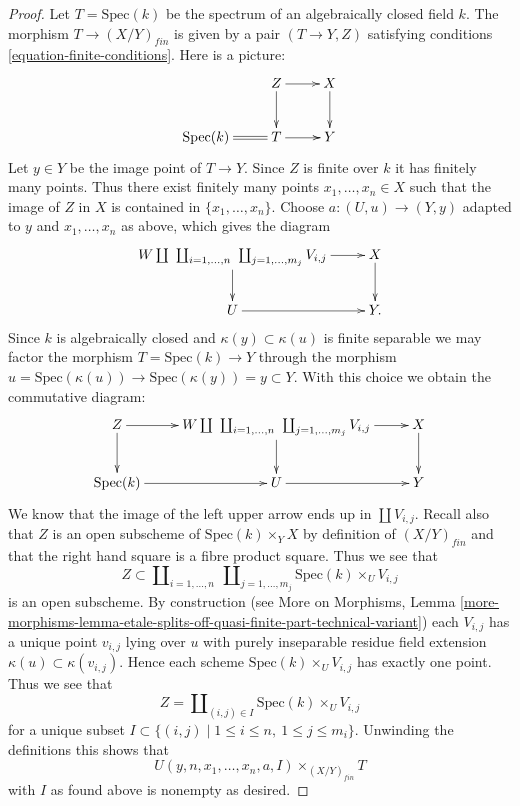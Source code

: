 \begin{proof}
\medskip\noindent
Let $T = \text{Spec}(k)$ be the spectrum of an algebraically closed
field $k$. The morphism $T \to (X/Y)_{fin}$ is given by a pair
$(T \to Y, Z)$ satisfying conditions \ref{equation-finite-conditions}.
Here is a picture:
$$
\xymatrix{
& Z \ar[d] \ar[r] & X \ar[d] \\
\text{Spec}(k) \ar@{=}[r] & T \ar[r] & Y
}
$$
Let $y \in Y$ be the image point of $T \to Y$.
Since $Z$ is finite over $k$ it has finitely many points.
Thus there exist finitely many points $x_1, \ldots, x_n \in X$
such that the image of $Z$ in $X$ is contained in $\{x_1, \ldots, x_n\}$.
Choose $a : (U, u) \to (Y, y)$ adapted to $y$ and $x_1, \ldots, x_n$ as
above, which gives the diagram
$$
\xymatrix{
W \coprod
\ \coprod\nolimits_{i = 1, \ldots, n}
\ \coprod\nolimits_{j = 1, \ldots, m_j}
V_{i, j} \ar[d] \ar[r] &
X \ar[d] \\
U \ar[r] & Y.
}
$$
Since $k$ is algebraically closed and
$\kappa(y) \subset \kappa(u)$ is finite separable
we may factor the morphism
$T = \text{Spec}(k) \to Y$ through the morphism
$u = \text{Spec}(\kappa(u)) \to \text{Spec}(\kappa(y)) = y \subset Y$.
With this choice we obtain the commutative diagram:
$$
\xymatrix{
Z \ar[d] \ar[r] &
W \coprod
\ \coprod\nolimits_{i = 1, \ldots, n}
\ \coprod\nolimits_{j = 1, \ldots, m_j}
V_{i, j} \ar[d] \ar[r] &
X \ar[d] \\
\text{Spec}(k) \ar[r] &
U \ar[r] & Y
}
$$
We know that the image of the left upper arrow ends up in
$\coprod V_{i, j}$. Recall also that $Z$ is an open subscheme
of $\text{Spec}(k) \times_Y X$ by definition of $(X/Y)_{fin}$
and that the right hand square is a fibre product square.
Thus we see that
$$
Z \subset
\coprod\nolimits_{i = 1, \ldots, n}\ \coprod\nolimits_{j = 1, \ldots, m_j}
\text{Spec}(k) \times_U V_{i, j}
$$
is an open subscheme. By construction (see
More on Morphisms, Lemma
\ref{more-morphisms-lemma-etale-splits-off-quasi-finite-part-technical-variant})
each $V_{i, j}$ has a unique point $v_{i, j}$ lying over $u$
with purely inseparable residue field extension
$\kappa(u) \subset \kappa(v_{i, j})$. Hence each
scheme $\text{Spec}(k) \times_U V_{i, j}$ has exactly one
point. Thus we see that
$$
Z = \coprod\nolimits_{(i, j) \in I} \text{Spec}(k) \times_U V_{i, j}
$$
for a unique subset
$I \subset \{(i, j) \mid 1 \leq i \leq n,\ 1 \leq j \leq m_i\}$.
Unwinding the definitions this shows that
$$
U(y, n, x_1, \ldots, x_n, a, I) \times_{(X/Y)_{fin}} T
$$
with $I$ as found above is nonempty as desired.
\end{proof}

